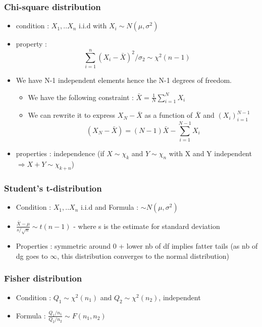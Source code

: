 \documentclass{article}
\begin{document}
\subsubsection{Chi-square distribution}
\begin{itemize}
    \item condition : $X_1, ..X_n$ i.i.d with $X_i\sim N(\mu,\sigma^2)$
    \item property : 
\begin{equation}
    \sum_{i=1}^n(X_i-\bar{X})^2/\sigma_2 \sim \chi^2(n-1)
\end{equation}
    \item We have N-1 independent elements hence the N-1 degrees of freedom. 
\begin{proofbox}
\begin{itemize}
    \item We have the following constraint : $\bar{X}=\frac{1}{N}\sum_{i=1}^NX_i$
    \item We can rewrite it to express $X_N-\bar{X}$ as a function of $\bar{X}$ and $(X_i)_{i=1}^{N-1}$
\begin{equation}
    (X_N-\bar{X}) = (N-1)\bar{X}-\sum_{i=1}^{N-1}X_i
\end{equation}
\end{itemize}   
\end{proofbox}
    \item properties : independence (if $X\sim \chi_k$ and $Y\sim \chi_n$ with X and Y independent $\Longrightarrow X+Y\sim\chi_{k+n}$)
\end{itemize}

\subsubsection{Student's t-distribution}
\begin{itemize}
    \item Condition : $X_1,..X_n$ i.i.d and Formula : $\sim N(\mu,\sigma^2)$
    \item $\frac{\bar{X}-\mu}{s/\sqrt{n}}\sim t(n-1)$
    \subitem - where s is the estimate for standard deviation 
    \item Properties : symmetric around 0  + lower nb of df implies fatter tails (as nb of dg goes to $\infty$, this distribution converges to the normal distribution)
\end{itemize}

\subsubsection{Fisher distribution}
\begin{itemize}
    \item Condition : $Q_1\sim \chi^2(n_1)$ and $Q_2\sim \chi^2(n_2)$, independent
    \item Formula : $\frac{Q_1/n_1}{Q_2/n_2}\sim F(n_1,n_2)$
\end{itemize}
\end{document}
